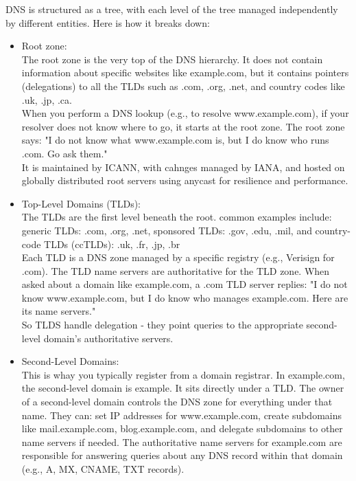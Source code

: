 \documentclass{article}
\begin{document}
DNS is structured as a tree, with each level of the tree managed independently by different entities. Here is how it breaks down:
	\begin{itemize}
		\item Root zone:\\
			The root zone is the very top of the DNS hierarchy. It does not contain information about specific websites like example.com, but it contains pointers (delegations) to all the TLDs such as .com, .org, .net, and country codes like .uk, .jp, .ca.\\

			When you perform a DNS lookup (e.g., to resolve www.example.com), if your resolver does not know where to go, it starts at the root zone. The root zone says: "I do not know what www.example.com is, but I do know who runs .com. Go ask them."\\

			It is maintained by ICANN, with cahnges managed by IANA, and hosted on globally distributed root servers using anycast for resilience and performance.

		\item Top-Level Domains (TLDs):\\
			The TLDs are the first level beneath the root. common examples include: generic TLDs: .com, .org, .net, sponsored TLDs: .gov, .edu, .mil, and country-code TLDs (ccTLDs): .uk, .fr, .jp, .br\\

			Each TLD is a DNS zone managed by a specific registry (e.g., Verisign for .com). The TLD name servers are authoritative for the TLD zone. When asked about a domain like example.com, a .com TLD server replies: "I do not know www.example.com, but I do know who manages example.com. Here are its name servers."\\

			So TLDS handle delegation - they point queries to the appropriate second-level domain's authoritative servers.

		\item Second-Level Domains:\\
			This is whay you typically register from a domain registrar. In example.com, the second-level domain is example. It sits directly under a TLD. The owner of a second-level domain controls the DNS zone for everything under that name. They can: set IP addresses for www.example.com, create subdomains like mail.example.com, blog.example.com, and delegate subdomains to other name servers if needed. The authoritative name servers for example.com are responsible for answering queries about any DNS record within that domain (e.g., A, MX, CNAME, TXT records).


\end{itemize}
\end{document}
